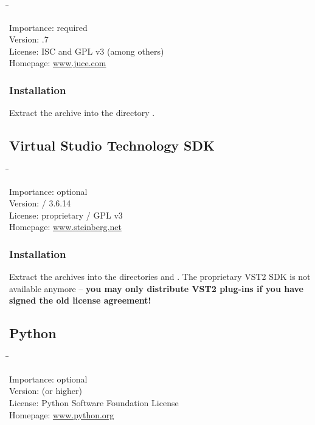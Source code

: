 \begin{tabbing}
  \hspace*{6em}\=\=\kill

  Importance:  \> required \\
  Version:     .7 \\
  License:     \> ISC and GPL v3 (among others) \\
  Homepage:    \> \href{http://www.juce.com/}{www.juce.com}
\end{tabbing}

\subsubsection{Installation}

Extract the archive into the directory .

\subsection{Virtual Studio Technology SDK}

\begin{tabbing}
  \hspace*{6em}\=\=\kill

  Importance:  \> optional \\
  Version:      / 3.6.14 \\
  License:     \> proprietary / GPL v3 \\
  Homepage:    \> \href{http://www.steinberg.net/en/company/developer.html}{www.steinberg.net}
\end{tabbing}

\subsubsection{Installation}

Extract the archives into the directories  and
.  The proprietary VST2 SDK is not available
anymore -- \textbf{you may only distribute VST2 plug-ins if you have
  signed the old license agreement!}

\subsection{Python}

\begin{tabbing}
  \hspace*{6em}\=\=\kill

  Importance:  \> optional \\
  Version:      (or higher) \\
  License:     \> Python Software Foundation License \\
  Homepage:    \> \href{http://www.python.org/}{www.python.org}
\end{tabbing}

